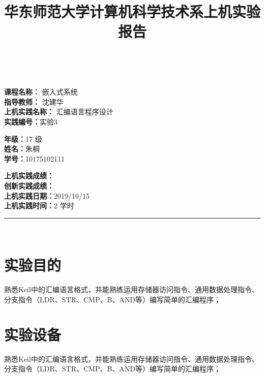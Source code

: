 \documentclass[a4paper,10pt,UTF8]{paper}
\title{华东师范大学计算机科学技术系上机实验报告}
\numberwithin{equation}{section}
\numberwithin{figure}{section}
\begin{document}
\pagestyle{fancy}
\lhead{}
\rhead{}
\makeatletter
\def\headrule{{\if@fancyplain\let\headrulewidth\plainheadrulewidth\fi%
\color{gray}\hrule\@height 0.2pt\@width\headwidth}
  \vspace{6mm}}
\makeatother

\newcommand{\HRule}{\rule{\linewidth}{1mm}}
\newcommand{\dai}{\textbf{Dais-CMX16$^+$}}

{ \\ [0.8cm]
		
	\small{
		\begin{minipage}[t]{.32\linewidth}
			\textbf{课程名称：} 嵌入式系统\\
			\textbf{指导教师：} 沈建华\\
			\textbf{上机实践名称：} 汇编语言程序设计\\
			\textbf{实践编号：}实验3
		\end{minipage}
		\begin{minipage}[t]{.32\linewidth}
			\textbf{年级：}17 级\\
			\textbf{姓名：}朱桐\\
			\textbf{学号：}10175102111\\
		\end{minipage} 
		\begin{minipage}[t]{.32\linewidth}
			\textbf{上机实践成绩：} \\
			\textbf{创新实践成绩：} \\
			\textbf{上机实践日期：}2019/10/15\\
			\textbf{上机实践时间：}2 学时\\
		\end{minipage}
	}
	\HRule \\[0.5cm]
}
\section{实验目的}

熟悉Keil中的汇编语言格式，并能熟练运用存储器访问指令、通用数据处理指令、分支指令（LDR、STR、CMP、B、AND等）编写简单的汇编程序；


\section{实验设备}

熟悉Keil中的汇编语言格式，并能熟练运用存储器访问指令、通用数据处理指令、分支指令（LDR、STR、CMP、B、AND等）编写简单的汇编程序；
\end{document}

